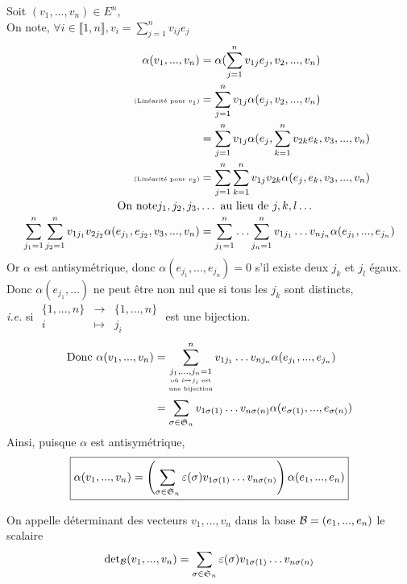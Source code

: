 \documentclass[12pt,a4paper,final]{article}
\begin{document}
	\newpage
	\noindent
	Soit $(v_1, ..., v_n) \in E^n$, \\
	On note, $\forall i \in \llbracket 1, n \rrbracket, v_i = \sum\limits_{j=1}^n v_{ij}e_j$
	\begin{align*}
		\alpha(v_1, ..., v_n)
			&= \alpha(\sum_{j=1}^nv_{1j}e_j, v_2, ..., v_n) \\
		\text{\tiny{(Lin\'earit\'e pour $v_1$)}}
			&= \sum_{j=1}^nv_{1j}\alpha(e_j, v_2, ..., v_n) \\
		&= \sum_{j=1}^nv_{1j}\alpha(e_j, \sum_{k=1}^nv_{2k}e_k, v_3, ..., v_n) \\
		\text{\tiny{(Lin\'earit\'e pour $v_2$)}}
			&= \sum_{j=1}^n\sum_{k=1}^nv_{1j}v_{2k}\alpha(e_j, e_k, v_3, ..., v_n) \\
		\text{On note} j_1, j_2, j_3, & \ldots \text{ au lieu de } j, k, l \ldots \\
		\sum_{j_1=1}^n\sum_{j_2=1}^nv_{1j_1}v_{2j_2}\alpha(e_{j_1}, e_{j_2}, v_3, ..., v_n)
			&= \sum_{j_1=1}^n\ldots\sum_{j_n=1}^nv_{1j_1}\ldots v_{nj_n}\alpha(e_{j_1}, ..., e_{j_n})
	\end{align*}
	Or $\alpha$ est antisym\'etrique, donc $\alpha(e_{j_1}, ..., e_{j_n}) = 0$ s'il existe deux $j_k$ et $j_l$ \'egaux.
	Donc $\alpha(e_{j_1}, \ldots)$ ne peut \^etre non nul que si tous les $j_k$ sont distincts, \\
	\textit{i.e.} si
	$\begin{matrix}
		\{1, ..., n\} & \to & \{1, ..., n\} \\
		i & \mapsto & j_i
	\end{matrix}$
	est une bijection.
	\begin{align*}
		\text{Donc } \alpha(v_1, ..., v_n)
			&= \sum_{\underset{\underset{\text{une bijection}}{\text{o\`u }
			i\mapsto j_i \text{ est}}}{j_1, ..., j_n = 1}}^n
			v_{1j_1} \ldots v_{nj_n} \alpha(e_{j_1}, ..., e_{j_n}) \\
		&= \sum_{\sigma \in \mathfrak{S}_{n}}v_{1\sigma(1)} \ldots v_{n\sigma(n)}
			\alpha(e_{\sigma(1)}, ..., e_{\sigma(n)})
	\end{align*}
	Ainsi, puisque $\alpha$ est antisym\'etrique,
	\begin{equation} \label{eq:1}
		\boxed{
			\alpha(v_1, ..., v_n) =
			\left( \sum_{\sigma\in\mathfrak{S}_{n}}\varepsilon(\sigma)v_{1\sigma(1)} \ldots v_{n\sigma(n)} \right)
			\alpha(e_1, ..., e_n)
		}
	\end{equation}
	\newpage
	\begin{defn}
		On appelle d\'eterminant des vecteurs $v_1, ..., v_n$ dans la base $\mathcal{B}=(e_1, ..., e_n)$ le scalaire
		\[ \operatorname{det}_{\mathcal{B}} (v_1, ..., v_n) = \sum_{\sigma\in\mathfrak{S}_{n}}\varepsilon(\sigma)v_{1\sigma(1)} \ldots v_{n\sigma(n)} \]
	\end{defn}
\end{document}

